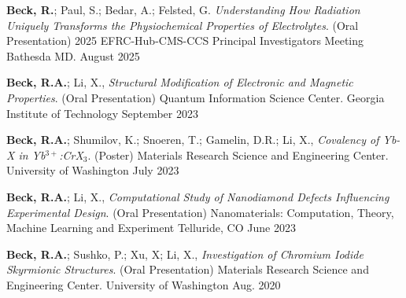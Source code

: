 

\begin{cvpresentations}

\cvpresentation %
{\textbf{Beck, R.}; Paul, S.; Bedar, A.; Felsted, G. \textit{Understanding How Radiation Uniquely Transforms the Physiochemical Properties of Electrolytes}. (Oral Presentation) 2025 EFRC-Hub-CMS-CCS Principal Investigators Meeting}
{Bathesda MD.} %
{August 2025} %

\cvpresentation %
{\textbf{Beck, R.A.}; Li, X., \textit{Structural Modification of Electronic and Magnetic Properties}. (Oral Presentation) Quantum Information Science Center.}
{Georgia Institute of Technology} %
{September 2023} %

\cvpresentation %
{\textbf{Beck, R.A.}; Shumilov, K.; Snoeren, T.; Gamelin, D.R.; Li, X., \textit{Covalency of Yb-X in Yb$^{3+}$:CrX$_3$}. (Poster) Materials Research Science and Engineering Center.}
{University of Washington} %
{July 2023} %

\cvpresentation %
{\textbf{Beck, R.A.}; Li, X., \textit{Computational Study of Nanodiamond Defects Influencing Experimental Design}. (Oral Presentation) Nanomaterials: Computation, Theory, Machine Learning and Experiment}
{Telluride, CO} %
{June 2023} %

\cvpresentation %
{\textbf{Beck, R.A.}; Sushko, P.; Xu, X; Li, X., \textit{Investigation of Chromium Iodide Skyrmionic Structures}. (Oral Presentation) Materials Research Science and Engineering Center.}
{University of Washington} %
{Aug. 2020} %



\end{cvpresentations}
